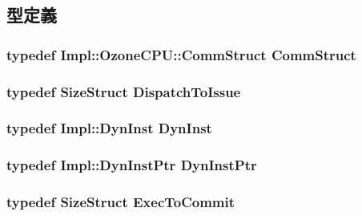 \subsection{型定義}
\hypertarget{classLWBackEnd_abdf3026ccc30c2ed3cb77dbe3cfbacad}{
\subsubsection[{CommStruct}]{\setlength{\rightskip}{0pt plus 5cm}typedef Impl::OzoneCPU::CommStruct {\bf CommStruct}}}
\label{classLWBackEnd_abdf3026ccc30c2ed3cb77dbe3cfbacad}
\hypertarget{classLWBackEnd_a99d236038ce57aa3ef78858228c5f972}{
\subsubsection[{DispatchToIssue}]{\setlength{\rightskip}{0pt plus 5cm}typedef {\bf SizeStruct} {\bf DispatchToIssue}}}
\label{classLWBackEnd_a99d236038ce57aa3ef78858228c5f972}
\hypertarget{classLWBackEnd_ab741745c86a14c765b999c11167636d9}{
\subsubsection[{DynInst}]{\setlength{\rightskip}{0pt plus 5cm}typedef Impl::DynInst {\bf DynInst}}}
\label{classLWBackEnd_ab741745c86a14c765b999c11167636d9}
\hypertarget{classLWBackEnd_a028ce10889c5f6450239d9e9a7347976}{
\subsubsection[{DynInstPtr}]{\setlength{\rightskip}{0pt plus 5cm}typedef Impl::DynInstPtr {\bf DynInstPtr}}}
\label{classLWBackEnd_a028ce10889c5f6450239d9e9a7347976}
\hypertarget{classLWBackEnd_a91ea582041466725b4b17ce19f98685f}{
\subsubsection[{ExecToCommit}]{\setlength{\rightskip}{0pt plus 5cm}typedef {\bf SizeStruct} {\bf ExecToCommit}}}
